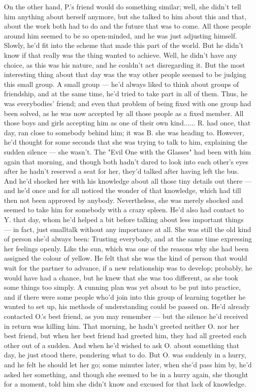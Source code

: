 On the other hand, P.'s friend would do something similar; well, she didn't tell him anything about herself anymore, but she talked to him about this and that, about the work both had to do and the future that was to come. All those people around him seemed to be so open-minded, and he was just adjusting himself. 
Slowly, he'd fit into the scheme that made this part of the world. 
But he didn't know if that really was the thing wanted to achieve. Well, he didn't have any choice, as this was his nature, and he couldn't act disregarding it. 
But the most interesting thing about that day was the way other people seemed to be judging this small group. 
A small group --- he'd always liked to think about groups of friendship, and at the same time, he'd tried to take part in all of them. Thus, he was everybodies' friend; and even that problem of being fixed with one group had been solved, as he was now accepted by all those people as a fixed member. All those boys and girls accepting him as one of their own kind......
R. had once, that day, ran close to somebody behind him; it was B. she was heading to. However, he'd thought for some seconds that she was trying to talk to him, explaining the sudden silence --- she wasn't. 
The "Evil One with the Glasses" had been with him again that morning, and though both hadn't dared to look into each other's eyes after he hadn't reserved a seat for her, they'd talked after having left the bus. And he'd shocked her with his knowledge about all those tiny details out there --- and he'd once and for all noticed the wonder of that knowledge, which had till then not been approved by anybody. Nevertheless, she was merely shocked and seemed to take him for somebody with a crazy spleen. 
He'd also had contact to Y. that day, whom he'd helped a bit before talking about less important things --- in fact, just smalltalk without any importance at all. 
She was still the old kind of person she'd always been: Trusting everybody, and at the same time expressing her feelings openly. Like the sun, which was one of the reasons why she had been assigned the colour of yellow. He felt that she was the kind of person that would wait for the partner to advance, if a new relationship was to develop; probably, he would have had a chance, but he knew that she was too different, as she took some things too simply. 
A cunning plan was yet about to be put into practice, and if there were some people who'd join into this group of learning together he wanted to set up, his methods of understanding could be passed on. He'd already contacted O.'s best friend, as you may remember --- but the silence he'd received in return was killing him. That morning, he hadn't greeted neither O. nor her best friend, but when her best friend had greeted him, they had all greeted each other out of a sudden. And when he'd wished to ask O. about something that day, he just stood there, pondering what to do. But O. was suddenly in a hurry, and he felt he should let her go; some minutes later, when she'd pass him by, he'd asked her something, and though she seemed to be in a hurry again, she thought for a moment, told him she didn't know and excused for that lack of knowledge. 
